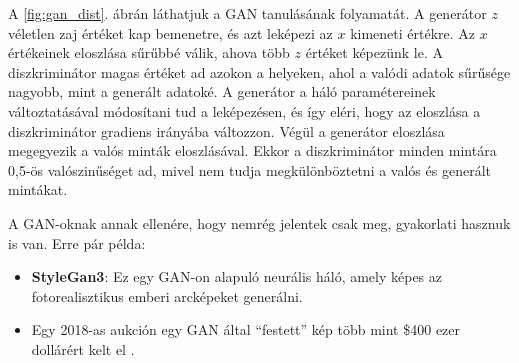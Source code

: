 A \ref{fig:gan_dist}. ábrán láthatjuk a GAN tanulásának folyamatát. A generátor $z$ véletlen zaj értéket kap bemenetre, és azt leképezi az $x$ kimeneti értékre. Az $x$ értékeinek eloszlása sűrűbbé válik, ahova több $z$ értéket képezünk le. A diszkriminátor magas értéket ad azokon a helyeken, ahol a valódi adatok sűrűsége nagyobb, mint a generált adatoké. A generátor a háló paramétereinek változtatásával módosítani tud a leképezésen, és így eléri, hogy az eloszlása a diszkriminátor gradiens irányába változzon. Végül a generátor eloszlása megegyezik a valós minták eloszlásával. Ekkor a diszkriminátor minden mintára 0,5-ös valószinűséget ad, mivel nem tudja megkülönböztetni a valós és generált mintákat.



A GAN-oknak annak ellenére, hogy nemrég jelentek csak meg, gyakorlati hasznuk is van. Erre pár példa:
\begin{itemize}
	\item \textbf{StyleGan3}: Ez egy GAN-on alapuló neurális háló, amely képes az fotorealisztikus emberi arcképeket generálni. \cite{stylegan3}
	\item Egy 2018-as aukción egy GAN által ``festett'' kép több mint \$400 ezer dollárért kelt el \cite{AIart}. 
\end{itemize}

